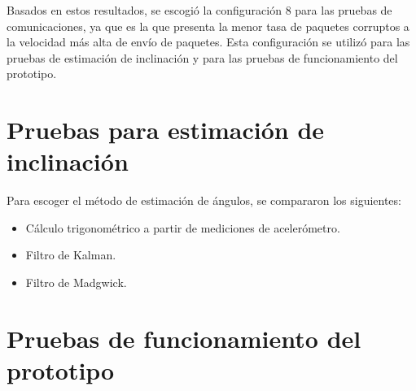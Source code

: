 Basados en estos resultados, se escogió la configuración 8 para las pruebas de comunicaciones, ya que es la que presenta la menor tasa de paquetes corruptos a la velocidad más alta de envío de paquetes. Esta configuración se utilizó para las pruebas de estimación de inclinación y para las pruebas de funcionamiento del prototipo.

\section{Pruebas para estimación de inclinación}

Para escoger el método de estimación de ángulos, se compararon los siguientes:

\begin{itemize}
    \item Cálculo trigonométrico a partir de mediciones de acelerómetro.
    \item Filtro de Kalman.
    \item Filtro de Madgwick.
\end{itemize}



\section{Pruebas de funcionamiento del prototipo}